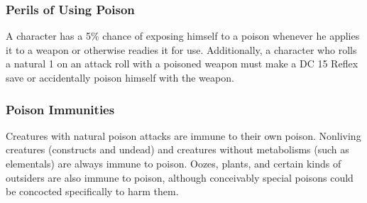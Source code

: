 
\subsubsection{Perils of Using Poison}

A character has a 5\% chance of exposing himself to a poison whenever he applies it to a weapon or otherwise readies it for use. Additionally, a character who rolls a natural 1 on an attack roll with a poisoned weapon must make a DC 15 Reflex save or accidentally poison himself with the weapon.

\subsubsection{Poison Immunities}

Creatures with natural poison attacks are immune to their own poison. Nonliving creatures (constructs and undead) and creatures without metabolisms (such as elementals) are always immune to poison. Oozes, plants, and certain kinds of outsiders are also immune to poison, although conceivably special poisons could be concocted specifically to harm them.

